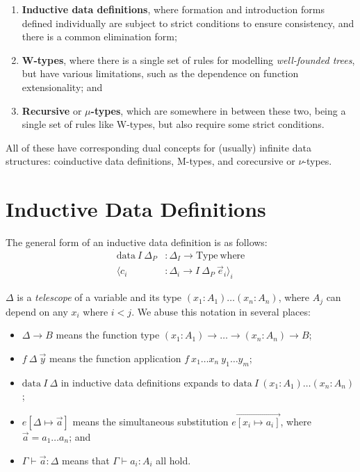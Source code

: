 \documentclass{report}
\newcommand{\const}[1]{\text{#1}}
\newcommand{\data}{\const{data}}
\newcommand{\Type}{\const{Type}}
\newcommand{\where}{\const{where}}
\begin{document}
\begin{enumerate}
    \item \textbf{Inductive data definitions}, where formation and introduction forms defined individually are subject to strict conditions to ensure consistency, and there is a common elimination form;
    \item \textbf{W-types}, where there is a single set of rules for modelling \emph{well-founded trees}, but have various limitations, such as the dependence on function extensionality; and
    \item \textbf{Recursive} or \textbf{$\mu$-types}, which are somewhere in between these two, being a single set of rules like W-types, but also require some strict conditions.
\end{enumerate}

All of these have corresponding dual concepts for (usually) infinite data structures: coinductive data definitions, M-types, and corecursive or $\nu$-types.

\section{Inductive Data Definitions}

The general form of an inductive data definition is as follows:
%
\begin{align*}
    \data ~ I ~ \Delta_P &: \Delta_I \to \Type ~ \where \\
    \langle c_i &: \Delta_i \to I ~ \Delta_P ~ \Vec{e}_i \rangle_i
\end{align*}

$\Delta$ is a \emph{telescope} of a variable and its type $(x_1: A_1) \dots (x_n: A_n)$, where $A_j$ can depend on any $x_i$ where $i < j$. We abuse this notation in several places:
%
\begin{itemize}
    \item $\Delta \to B$ means the function type $(x_1: A_1) \to \dots \to (x_n: A_n) \to B$;
    \item $f ~ \Delta ~ \Vec{y}$ means the function application $f ~ x_1 \dots x_n ~ y_1 \dots y_m$;
    \item $\data ~ I ~ \Delta$ in inductive data definitions expands to $\data ~ I ~ (x_1: A_1) \dots (x_n: A_n)$;
    \item $e[\Delta \mapsto \Vec{a}]$ means the simultaneous substitution $e\overrightarrow{[x_i \mapsto a_i]}$, where $\Vec{a} = a_1 \dots a_n$; and
    \item $\Gamma \vdash \Vec{a} : \Delta$ means that $\Gamma \vdash a_i: A_i$ all hold.
\end{itemize}
\end{document}
